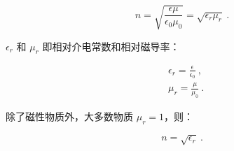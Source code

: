 \begin{equation}
n = \sqrt{\frac{\epsilon \mu}{\epsilon_0 \mu_0}} = \sqrt{\epsilon_r \mu_r} ~.
\end{equation}

$\epsilon_r$ 和 $\mu_r$ 即相对介电常数和相对磁导率：

\begin{equation}
\begin{aligned}
& \epsilon_r = \frac{\epsilon}{\epsilon_0} ~, \\
& \mu_r = \frac{\mu}{\mu_0} ~.
\end{aligned}
\end{equation}

除了磁性物质外，大多数物质 $\mu_r = 1$，则：

\begin{equation}
n = \sqrt{\epsilon_r} ~.
\end{equation}

